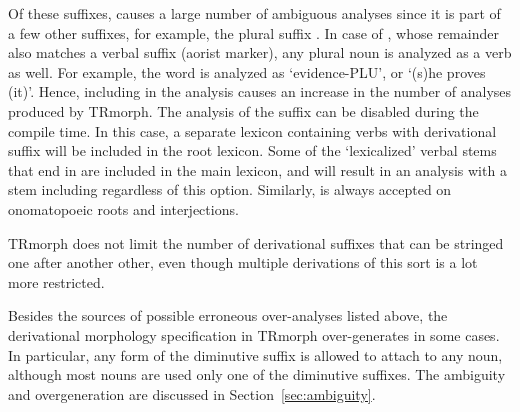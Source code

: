 \documentclass[twocolumn]{article}
\begin{document}
Of these suffixes,  causes a large number of ambiguous analyses 
since it is part of a few other suffixes, 
for example, the plural suffix .
In case of , whose remainder  also matches a verbal suffix (aorist marker),
any plural noun is analyzed as a verb as well.
For example, the word  is analyzed as  `evidence-PLU', or  `(s)he proves (it)'.
Hence, including  in the analysis causes an increase in the number of analyses produced by TRmorph.
The analysis of the suffix  can be disabled during the compile time.
In this case, a separate lexicon containing verbs with derivational suffix  will be included in the root lexicon.
Some of the `lexicalized' verbal stems that end in  are included in the main lexicon,
and will result in an analysis with a stem including  regardless of this option.
Similarly,  is always accepted on onomatopoeic roots and interjections.

TRmorph does not limit the number of derivational suffixes that can be stringed one after another other, 
even though multiple derivations of this sort is a lot more restricted. 

Besides the sources of possible erroneous over-analyses listed above,
the derivational morphology specification in TRmorph over-generates in
some cases. In particular, any form of the diminutive suffix is
allowed to attach to any noun, although most nouns are used only one
of the diminutive suffixes. The ambiguity and overgeneration are
discussed in Section~\ref{sec:ambiguity}.
\end{document}
